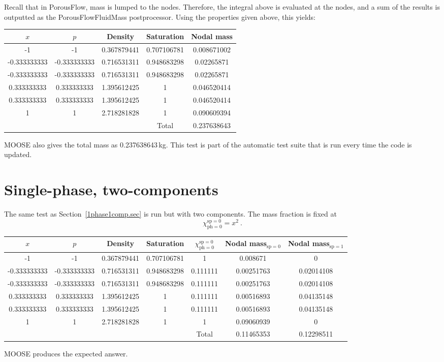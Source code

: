 \documentclass[]{scrreprt}
\def\species{\mathrm{sp}}
\def\phase{\mathrm{ph}}
\def\massfrac{\chi}
\begin{document}
Recall that in PorousFlow, mass is lumped to the nodes.  Therefore,
the integral above is evaluated at the nodes, and a sum of the results
is outputted as the PorousFlowFluidMass postprocessor.
Using the properties given above, this yields:
\begin{center}
\begin{tabular}{|ccccc|}
\hline
$x$ & $p$ & Density & Saturation & Nodal mass \\
\hline
-1 & -1 & 0.367879441 & 0.707106781 & 0.008671002 \\
-0.333333333 & -0.333333333 & 0.716531311 & 0.948683298 & 0.02265871 \\
-0.333333333 & -0.333333333 & 0.716531311 & 0.948683298 & 0.02265871 \\
0.333333333 & 0.333333333 & 1.395612425 & 1 & 0.046520414 \\
0.333333333 & 0.333333333 & 1.395612425 & 1 & 0.046520414 \\
1& 1 & 2.718281828 & 1 & 0.090609394 \\
\hline
 & & & Total & 0.237638643 \\
\hline
\end{tabular}
\end{center}
MOOSE also gives the total mass as 0.237638643\,kg.  This test is part of
the automatic test suite that is run every time the code is updated.

\newpage

\section{Single-phase, two-components}

The same test as Section~\ref{1phase1comp.sec} is run but with two
components.  The mass fraction is fixed at
\begin{equation}
\massfrac_{\phase=0}^{\species=0} = x^{2} \ .
\end{equation}

\begin{center}
\begin{tabular}{|ccccccc|}
\hline
$x$ & $p$ & Density & Saturation & $\massfrac_{\phase=0}^{\species=0}$
& Nodal mass$_{\species=0}$ & Nodal mass$_{\species=1}$ \\
\hline
-1 & -1 & 0.367879441 & 0.707106781 & 1 & 0.008671 & 0 \\
-0.333333333 & -0.333333333 & 0.716531311 & 0.948683298 & 0.111111 &
0.00251763 & 0.02014108 \\
-0.333333333 & -0.333333333 & 0.716531311 & 0.948683298 & 0.111111 &
0.00251763 & 0.02014108 \\
0.333333333 & 0.333333333 & 1.395612425 & 1 & 0.111111 & 0.00516893 &
0.04135148 \\
0.333333333 & 0.333333333 & 1.395612425 & 1 & 0.111111 & 0.00516893 &
0.04135148 \\
1& 1 & 2.718281828 & 1 & 1 & 0.09060939 & 0 \\
\hline
 & & & & Total & 0.11465353 & 0.12298511 \\
\hline
\end{tabular}
\end{center}

MOOSE produces the expected answer.
\end{document}
